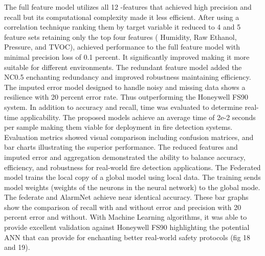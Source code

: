 \documentclass[conference]{IEEEtran}
\begin{document}
The full feature model utilizes all 12 -features that achieved high precision and recall but its computational complexity made it less efficient. After using a correlation technique ranking them by target variable it reduced to 4 and 5 feature sets retaining only the top four features ( Humidity, Raw Ethanol, Pressure, and TVOC), achieved performance to the full feature model with minimal precision loss of 0.1 percent. It significantly improved making it more suitable for different environments. The redundant feature model added the NC0.5 enchanting redundancy and improved robustness maintaining efficiency. The imputed error model designed to handle noisy and missing data shows a resilience with 20 percent error rate. Thus outperforming the Honeywell FS90 system. In addition to accuracy and recall, time was evaluated to determine real-time applicability. The proposed models achieve an average time of 2e-2 seconds per sample making them viable for deployment in fire detection systems. Evaluation metrics showed visual comparison including confusion matrices, and bar charts illustrating the superior performance. The reduced features and imputed error and aggregation demonstrated the ability to balance accuracy, efficiency, and robustness for real-world fire detection applications. The Federated model trains the local copy of a global model using local data. The training sends model weights (weights of the neurons in the neural network) to the global mode. The federate and AlarmNet achieve near identical accuracy. These bar graphs show the comparison of recall with and without error and precision with 20 percent error and without. With Machine Learning algorithms, it was able to provide excellent validation against Honeywell FS90 highlighting the potential ANN that can provide for enchanting better real-world safety protocols (fig 18 and 19). 
\end{document}
